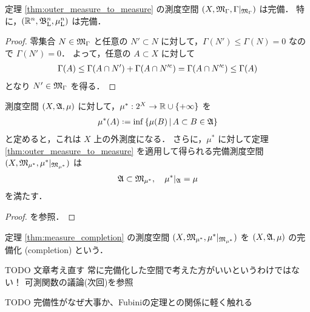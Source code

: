 \begin{proposition}
    定理 \ref{thm:outer_measure_to_measure} の測度空間 $(X,\mathfrak{M}_\Gamma,\Gamma\vert_{\mathfrak{M}_\Gamma})$ は完備．
    特に，$(\mathbb{R}^n,\mathfrak{B}_{\mathrm{L}}^n,\mu_{\mathrm{L}}^n)$ は完備．
\end{proposition}

\begin{proof}
    零集合 $N\in\mathfrak{M}_\Gamma$ と任意の $N'\subset N$ に対して，$\Gamma(N')\le\Gamma(N)=0$ なので $\Gamma(N')=0$．
    よって，任意の $A\subset X$ に対して
    \begin{align*}
        \Gamma(A)
        \le\Gamma(A\cap N')+\Gamma(A\cap N'^{\mathrm{c}})
        =\Gamma(A\cap N'^{\mathrm{c}})
        \le\Gamma(A)
    \end{align*}
    となり $N'\in\mathfrak{M}_\Gamma$ を得る．
\end{proof}

\begin{theorem}\label{thm:measure_completion}
    測度空間 $(X,\mathfrak{A},\mu)$ に対して，$\mu^\ast:2^X\to\mathbb{R}\cup\{+\infty\}$ を
    \begin{align*}
        \mu^\ast(A)\defeq\inf\left\{
            \mu(B)\,\middle\vert\,A\subset B\in\Afrak
        \right\}
    \end{align*}
    と定めると，これは $X$ 上の外測度になる．
    さらに，$\mu^\ast$ に対して定理 \ref{thm:outer_measure_to_measure} を適用して得られる完備測度空間
    $(X,\mathfrak{M}_{\mu^*},\mu^\ast\vert_{\mathfrak{M}_{\mu^\ast}})$ は
    \begin{align*}
        \mathfrak{A}\subset\mathfrak{M}_{\mu^*},\quad
        \mu^\ast\vert_{\mathfrak{A}}=\mu
    \end{align*}
    を満たす．
\end{theorem}

\begin{proof}
    \cite[定理 8.4]{It63} を参照．
\end{proof}

\begin{definition}
    定理 \ref{thm:measure_completion} の測度空間 $(X,\mathfrak{M}_{\mu^*},\mu^\ast\vert_{\mathfrak{M}_{\mu^\ast}})$ を
    $(X,\mathfrak{A},\mu)$ の完備化 (completion) という．
\end{definition}

{\color{red} TODO 文章考え直す}
常に完備化した空間で考えた方がいいというわけではない！ 
可測関数の議論(次回)を参照

{\color{red} TODO 完備性がなぜ大事か、Fubiniの定理との関係に軽く触れる}


